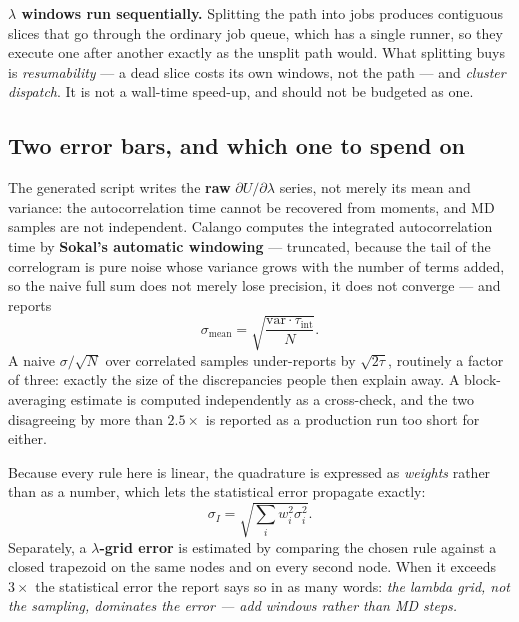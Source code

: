\begin{calwarn}
\textbf{$\lambda$ windows run sequentially.} Splitting the path into jobs
produces contiguous slices that go through the ordinary job queue, which has a
single runner, so they execute one after another exactly as the unsplit path
would. What splitting buys is \emph{resumability} --- a dead slice costs its own
windows, not the path --- and \emph{cluster dispatch}. It is not a wall-time
speed-up, and should not be budgeted as one.
\end{calwarn}

\subsection{Two error bars, and which one to spend on}

The generated script writes the \textbf{raw} $\partial U/\partial\lambda$
series, not merely its mean and variance: the autocorrelation time cannot be
recovered from moments, and MD samples are not independent. Calango computes the
integrated autocorrelation time by \textbf{Sokal's automatic windowing} ---
truncated, because the tail of the correlogram is pure noise whose variance
grows with the number of terms added, so the naive full sum does not merely lose
precision, it does not converge --- and reports
\begin{equation}
  \sigma_\mathrm{mean}
    = \sqrt{\frac{\mathrm{var}\cdot\tau_\mathrm{int}}{N}} .
\end{equation}
A naive $\sigma/\sqrt{N}$ over correlated samples under-reports by
$\sqrt{2\tau}$, routinely a factor of three: exactly the size of the
discrepancies people then explain away. A block-averaging estimate is computed
independently as a cross-check, and the two disagreeing by more than $2.5\times$
is reported as a production run too short for either.

Because every rule here is linear, the quadrature is expressed as
\emph{weights} rather than as a number, which lets the statistical error
propagate exactly:
\begin{equation}
  \sigma_I = \sqrt{\textstyle\sum_i w_i^2 \sigma_i^2} .
\end{equation}
Separately, a \textbf{$\lambda$-grid error} is estimated by comparing the chosen
rule against a closed trapezoid on the same nodes and on every second node. When
it exceeds $3\times$ the statistical error the report says so in as many words:
\emph{the lambda grid, not the sampling, dominates the error --- add windows
rather than MD steps.}

